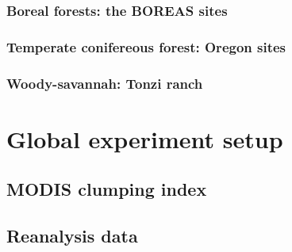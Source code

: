 \subsubsection{Boreal forests: the BOREAS sites}

\subsubsection{Temperate conifereous forest: Oregon sites}

\subsubsection{Woody-savannah: Tonzi ranch}

\section{Global experiment setup}

\subsection{MODIS clumping index}

\subsection{Reanalysis data}


